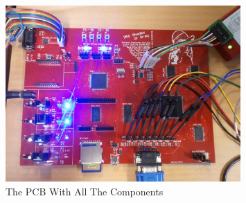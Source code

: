 \begin{figure}[h]
  \centering
  \includegraphics[width=0.8\textwidth]{fig/pcb/pcbwithcomp.jpg}
  \caption[The PCB]{The PCB With All The Components}
  \label{fig:pcb-with-components}
\end{figure}
